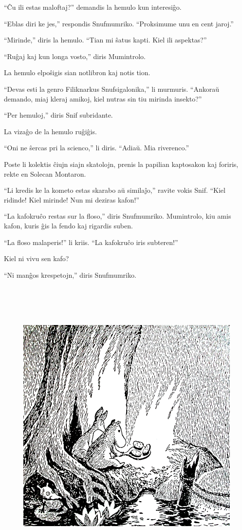 ``Ĉu ili estas maloftaj?'' demandis la hemulo kun interesiĝo.

``Eblas diri ke jes,'' respondis Snufmumriko. ``Proksimume unu en cent jaroj.''

``Mirinde,'' diris la hemulo. ``Tian mi ŝatus kapti. Kiel ili aspektas?''

``Ruĝaj kaj kun longa vosto,'' diris Mumintrolo.

La hemulo elpoŝigis sian notlibron kaj notis tion.

``Devas esti la genro Filiknarkus Snufsigalonika,'' li murmuris. ``Ankoraŭ demando, miaj kleraj amikoj, kiel nutras sin tiu mirinda insekto?''

``Per hemuloj,'' diris Snif subridante.

La vizaĝo de la hemulo ruĝiĝis.

``Oni ne ŝercas pri la scienco,'' li diris. ``Adiaŭ. Mia riverenco.''

Poste li kolektis ĉiujn siajn skatolojn, prenis la papilian kaptosakon kaj foriris, rekte en Solecan Montaron.

``Li kredis ke la kometo estas skarabo aŭ similaĵo,'' ravite vokis Snif. ``Kiel ridinde! Kiel mirinde! Nun mi deziras kafon!''

``La kafokruĉo restas sur la floso,'' diris Snufmumriko. Mumintrolo, kiu amis kafon, kuris ĝis la fendo kaj rigardis suben.

``La floso malaperis!'' li kriis. ``La kafokruĉo iris subteren!''

Kiel ni vivu sen kafo?

``Ni manĝos krespetojn,'' diris Snufmumriko.

\begin{figure}[htbp]
\centering
\includegraphics[width=439pt,height=427pt]{3-13.png}
\caption{}
\label{3-13}
\end{figure}

